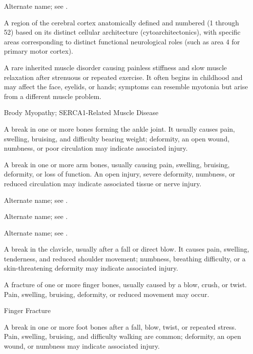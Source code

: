  Alternate name; see .

 A region of the cerebral cortex anatomically defined and numbered (1 through 52) based on its distinct cellular architecture (cytoarchitectonics), with specific areas corresponding to distinct functional neurological roles (such as area 4 for primary motor cortex).

 A rare inherited muscle disorder causing painless stiffness and slow muscle relaxation after strenuous or repeated exercise. It often begins in childhood and may affect the face, eyelids, or hands; symptoms can resemble myotonia but arise from a different muscle problem.

\synonyms
Brody Myopathy; SERCA1-Related Muscle Disease

 A break in one or more bones forming the ankle joint. It usually causes pain, swelling, bruising, and difficulty bearing weight; deformity, an open wound, numbness, or poor circulation may indicate associated injury.

 A break in one or more arm bones, usually causing pain, swelling, bruising, deformity, or loss of function. An open injury, severe deformity, numbness, or reduced circulation may indicate associated tissue or nerve injury.

 Alternate name; see .

 Alternate name; see .

 Alternate name; see .

 A break in the clavicle, usually after a fall or direct blow. It causes pain, swelling, tenderness, and reduced shoulder movement; numbness, breathing difficulty, or a skin-threatening deformity may indicate associated injury.

 A fracture of one or more finger bones, usually caused by a blow, crush, or twist. Pain, swelling, bruising, deformity, or reduced movement may occur.

\synonyms
Finger Fracture

 A break in one or more foot bones after a fall, blow, twist, or repeated stress. Pain, swelling, bruising, and difficulty walking are common; deformity, an open wound, or numbness may indicate associated injury.

